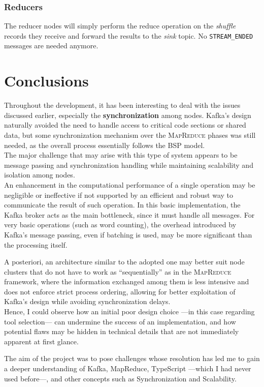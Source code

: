 \subsubsection{Reducers}
The reducer nodes will simply perform the reduce operation on the \textit{shuffle} records they receive and forward the results to the \textit{sink} topic.
No \verb|STREAM_ENDED| messages are needed anymore.


\section{Conclusions}

Throughout the development, it has been interesting to deal with the issues discussed earlier, especially the \textbf{synchronization} among nodes. Kafka's design naturally avoided the need to handle access to critical code sections or shared data, but some synchronization mechanism over the \textsc{MapReduce} phases was still needed, as the overall process essentially follows the \textsc{BSP} model.\\
The major challenge that may arise with this type of system appears to be message passing and synchronization handling while maintaining scalability and isolation among nodes.\\
An enhancement in the computational performance of a single operation may be negligible or ineffective if not supported by an efficient and robust way to communicate the result of such operation.
In this basic implementation, the Kafka broker acts as the main bottleneck, since it must handle all messages. For very basic operations (such as word counting), the overhead introduced by Kafka's message passing, even if batching is used, may be more significant than the processing itself.

A posteriori, an architecture similar to the adopted one may better suit node clusters that do not have to work as ``sequentially'' as in the \textsc{MapReduce} framework, where the information exchanged among them is less intensive and does not enforce strict process ordering, allowing for better exploitation of Kafka's design while avoiding synchronization delays.\\
Hence, I could observe how an initial poor design choice ---in this case regarding tool selection--- can undermine the success of an implementation, and how potential flaws may be hidden in technical details that are not immediately apparent at first glance.

The aim of the project was to pose challenges whose resolution has led me to gain a deeper understanding of Kafka, MapReduce, TypeScript ---which I had never used before---, and other concepts such as Synchronization and Scalability.